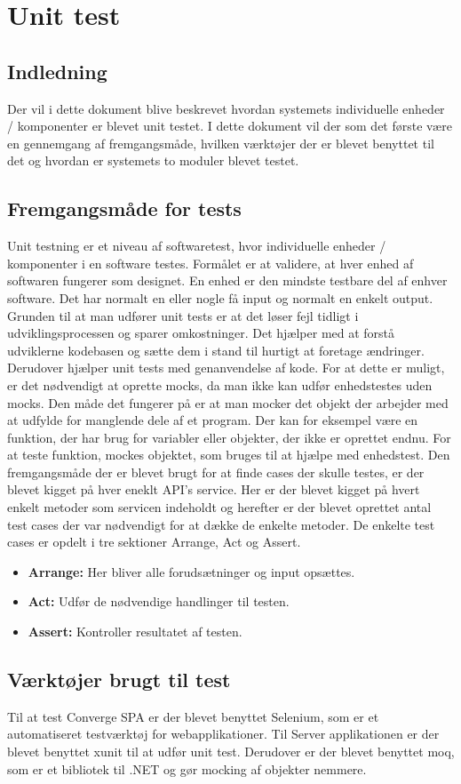 \chapter{Unit test}

\section{Indledning}
Der vil i dette dokument blive beskrevet hvordan systemets individuelle enheder / komponenter er blevet unit testet. I dette dokument vil der som det første være en gennemgang af fremgangsmåde, hvilken værktøjer der er blevet benyttet til det og hvordan er systemets to moduler blevet testet. 

\section{Fremgangsmåde for tests}

Unit testning er et niveau af softwaretest, hvor individuelle enheder / komponenter i en software testes. Formålet er at validere, at hver enhed af softwaren fungerer som designet. En enhed er den mindste testbare del af enhver software. Det har normalt en eller nogle få input og normalt en enkelt output. Grunden til at man udfører unit tests er at det løser fejl tidligt i udviklingsprocessen og sparer omkostninger. Det hjælper med at forstå udviklerne kodebasen og sætte dem i stand til hurtigt at foretage ændringer. Derudover hjælper unit tests med genanvendelse af kode.
For at dette er muligt, er det nødvendigt at oprette mocks, da man ikke kan udfør enhedstestes uden mocks. Den måde det fungerer på er at man mocker det objekt der arbejder med at udfylde for manglende dele af et program. Der kan for eksempel være en funktion, der har brug for variabler eller objekter, der ikke er oprettet endnu. For at teste funktion, mockes objektet, som bruges til at hjælpe med enhedstest.
Den fremgangsmåde der er blevet brugt for at finde cases der skulle testes, er der blevet kigget på hver eneklt API’s service. Her er der blevet kigget på hvert enkelt metoder som servicen indeholdt og herefter er der blevet oprettet antal test cases der var nødvendigt for at dække de enkelte metoder. De enkelte test cases er opdelt i tre sektioner Arrange, Act og Assert. 
\begin{itemize}
    \item \textbf{Arrange:}  Her bliver alle forudsætninger og input opsættes.
    \item \textbf{Act:} Udfør de nødvendige handlinger til testen. 
    \item \textbf{Assert:} Kontroller resultatet af testen.
    
\end{itemize}

\section{Værktøjer brugt til test}

Til at test Converge SPA er der blevet benyttet Selenium, som er et automatiseret testværktøj for webapplikationer.  Til Server applikationen er der blevet benyttet xunit til at udfør unit test. Derudover er der blevet benyttet moq, som er et bibliotek til .NET og gør mocking af objekter nemmere. 